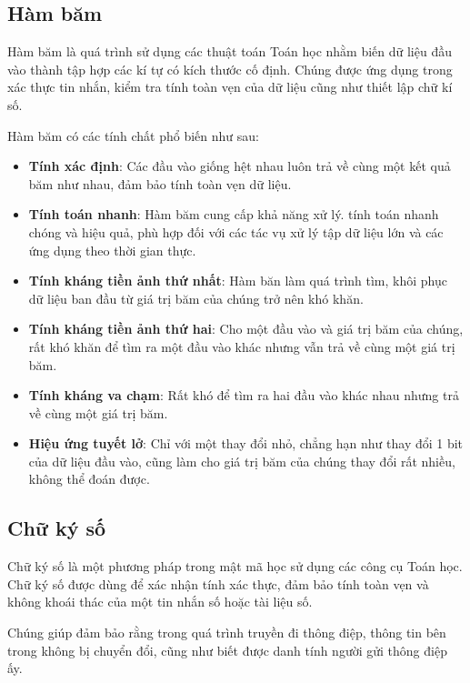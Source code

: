 \subsection{Hàm băm}

Hàm băm là quá trình sử dụng các thuật toán Toán học nhằm biến dữ liệu đầu vào thành tập hợp các kí tự có kích thước cố định. Chúng được ứng dụng trong xác thực tin nhắn, kiểm tra tính toàn vẹn của dữ liệu cũng như thiết lập chữ kí số.

Hàm băm có các tính chất phổ biến như sau:
\begin{itemize}
	\item \textbf{Tính xác định}: Các đầu vào giống hệt nhau luôn trả về cùng một kết quả băm như nhau, đảm bảo tính toàn vẹn dữ liệu.
	\item \textbf{Tính toán nhanh}: Hàm băm cung cấp khả năng xử lý. tính toán nhanh chóng và hiệu quả, phù hợp đối với các tác vụ xử lý tập dữ liệu lớn và các ứng dụng theo thời gian thực.
	\item \textbf{Tính kháng tiền ảnh thứ nhất}: Hàm băn làm quá trình tìm, khôi phục dữ liệu ban đầu từ giá trị băm của chúng trở nên khó khăn.
	\item \textbf{Tính kháng tiền ảnh thứ hai}: Cho một đầu vào và giá trị băm của chúng, rất khó khăn để tìm ra một đầu vào khác nhưng vẫn trả về cùng một giá trị băm.
	\item \textbf{Tính kháng va chạm}: Rất khó để tìm ra hai đầu vào khác nhau nhưng trả về cùng một giá trị băm.
	\item \textbf{Hiệu ứng tuyết lở}: Chỉ với một thay đổi nhỏ, chẳng hạn như thay đổi 1 bit của dữ liệu đầu vào, cũng làm cho giá trị băm của chúng thay đổi rất nhiều, không thể đoán được. \nocite{geeksforgeeks_hash_function}

\end{itemize}


\subsection{Chữ ký số}

Chữ ký số là một phương pháp trong mật mã học sử dụng các công cụ Toán học. Chữ ký số được dùng để xác nhận tính xác thực, đảm bảo tính toàn vẹn và không khoái thác của một tin nhắn số hoặc tài liệu số. 

Chúng giúp đảm bảo rằng trong quá trình truyền đi thông điệp, thông tin bên trong không bị chuyển đổi, cũng như biết được danh tính người gửi thông điệp ấy. \nocite{geeksforgeeks_digi}

